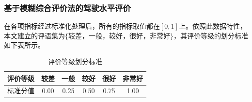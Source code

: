 \documentclass[bwprint]{cumcmthesis}
\begin{document}
            \subsubsection{基于模糊综合评价法的驾驶水平评价}
            在各项指标经过标准化处理后，所有的指标取值都在$[0,1]$上。依照此数据特性，本文建立的评语集为$\{\text{较差，一般，较好，很好，非常好}\}$，其评价等级的划分标准如下表所示。
            \begin{table}[htbp]
                \centering
                \caption{评价等级划分标准}
                    \begin{tabular}{|c|c|c|c|c|c|}
                    \hline
                    评价等级  & 较差    & 一般    & 较好    & 很好    & 非常好 \\
                    \hline
                    标准分值  & 0.00     & 0.25  & 0.50   & 0.75  & 1.00 \\
                    \hline
                    \end{tabular}
                \label{tab:nine}
            \end{table}
            
\end{document}
